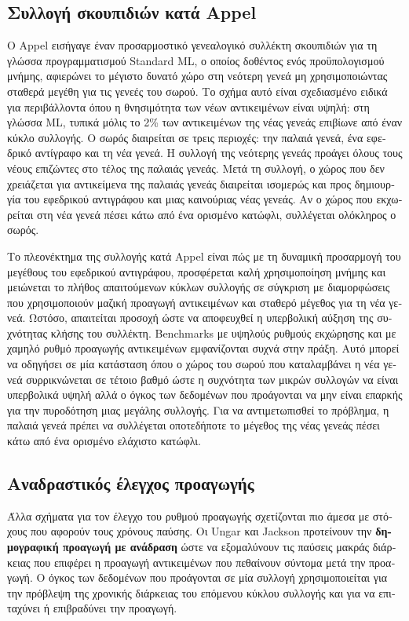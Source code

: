 \begin{greek}
\subsection{Συλλογή σκουπιδιών κατά Appel}
Ο Appel \cite{DBLP:journals/spe/Appel89a} εισήγαγε έναν προσαρμοστικό
γενεαλογικό συλλέκτη σκουπιδιών για τη γλώσσα προγραμματισμού
Standard ML, ο οποίος δοθέντος ενός προϋπολογισμού μνήμης,
αφιερώνει το μέγιστο δυνατό χώρο στη νεότερη γενεά μη χρησιμοποιώντας
σταθερά μεγέθη για τις γενεές του σωρού. Το σχήμα αυτό είναι
σχεδιασμένο ειδικά για περιβάλλοντα όπου η θνησιμότητα των
νέων αντικειμένων είναι υψηλή: στη γλώσσα ML, τυπικά μόλις το
2\% των αντικειμένων της νέας γενεάς επιβίωνε από έναν κύκλο
συλλογής. Ο σωρός διαιρείται σε τρεις περιοχές: την παλαιά γενεά,
ένα εφεδρικό αντίγραφο και τη νέα γενεά. Η συλλογή της νεότερης
γενεάς προάγει όλους τους νέους επιζώντες στο τέλος της παλαιάς
γενεάς. Μετά τη συλλογή, ο χώρος που δεν χρειάζεται για αντικείμενα
της παλαιάς γενεάς διαιρείται ισομερώς και προς δημιουργία του
εφεδρικού αντιγράφου και μιας καινούριας νέας γενεάς. Αν ο χώρος
που εκχωρείται στη νέα γενεά πέσει κάτω από ένα ορισμένο κατώφλι,
συλλέγεται ολόκληρος ο σωρός.

Το πλεονέκτημα της συλλογής κατά Appel είναι πώς με τη δυναμική
προσαρμογή του μεγέθους του εφεδρικού αντιγράφου, προσφέρεται
καλή χρησιμοποίηση μνήμης και μειώνεται το πλήθος απαιτούμενων
κύκλων συλλογής σε σύγκριση με διαμορφώσεις που χρησιμοποιούν
μαζική προαγωγή αντικειμένων και σταθερό μέγεθος για τη νέα
γενεά. Ωστόσο, απαιτείται προσοχή ώστε να αποφευχθεί η υπερβολική
αύξηση της συχνότητας κλήσης του συλλέκτη. Benchmarks με υψηλούς
ρυθμούς εκχώρησης και με χαμηλό ρυθμό προαγωγής αντικειμένων
εμφανίζονται συχνά στην πράξη. Αυτό μπορεί να οδηγήσει σε μία
κατάσταση όπου ο χώρος του σωρού που καταλαμβάνει η νέα γενεά
συρρικνώνεται σε τέτοιο βαθμό ώστε η συχνότητα των μικρών συλλογών
να είναι υπερβολικά υψηλή αλλά ο όγκος των δεδομένων που προάγονται
να μην είναι επαρκής για την πυροδότηση μιας μεγάλης συλλογής.
Για να αντιμετωπισθεί το πρόβλημα, η παλαιά γενεά πρέπει να
συλλέγεται οποτεδήποτε το μέγεθος της νέας γενεάς πέσει κάτω
από ένα ορισμένο ελάχιστο κατώφλι.

\subsection{Αναδραστικός έλεγχος προαγωγής}
Άλλα σχήματα για τον έλεγχο του ρυθμού προαγωγής σχετίζονται
πιο άμεσα με στόχους που αφορούν τους χρόνους παύσης. Οι Ungar
και Jackson \cite{DBLP:conf/oopsla/UngarJ88, DBLP:journals/toplas/UngarJ92}
προτείνουν την \textbf{δημογραφική προαγωγή με ανάδραση} ώστε
να εξομαλύνουν τις παύσεις μακράς διάρκειας που επιφέρει η
προαγωγή αντικειμένων που πεθαίνουν σύντομα μετά την προαγωγή.
Ο όγκος των δεδομένων που προάγονται σε μία συλλογή χρησιμοποιείται
για την πρόβλεψη της χρονικής διάρκειας του επόμενου κύκλου
συλλογής και για να επιταχύνει ή επιβραδύνει την προαγωγή.


\end{greek}
